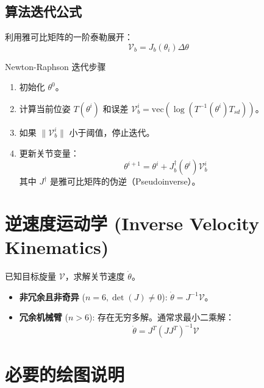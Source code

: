 \subsection{算法迭代公式}

利用雅可比矩阵的一阶泰勒展开：
\begin{equation}
    \mathcal{V}_b = J_b(\theta_i) \Delta \theta
\end{equation}

\begin{formulabox}{Newton-Raphson 迭代步骤}
\begin{enumerate}
    \item 初始化 $\theta^0$。
    \item 计算当前位姿 $T(\theta^i)$ 和误差 $\mathcal{V}_b^i = \text{vec}(\log(T^{-1}(\theta^i) T_{sd}))$。
    \item 如果 $\|\mathcal{V}_b^i\|$ 小于阈值，停止迭代。
    \item 更新关节变量：
    \begin{equation}
        \theta^{i+1} = \theta^i + J_b^\dagger(\theta^i) \mathcal{V}_b^i
    \end{equation}
    其中 $J^\dagger$ 是雅可比矩阵的伪逆（Pseudoinverse）。
\end{enumerate}
\end{formulabox}

\section{逆速度运动学 (Inverse Velocity Kinematics)}

已知目标旋量 $\mathcal{V}$，求解关节速度 $\dot{\theta}$。

\begin{itemize}
    \item \textbf{非冗余且非奇异} ($n=6, \det(J) \neq 0$): $\dot{\theta} = J^{-1} \mathcal{V}$。
    \item \textbf{冗余机械臂} ($n>6$): 存在无穷多解。通常求最小二乘解：
    \[ \dot{\theta} = J^T (J J^T)^{-1} \mathcal{V} \]
\end{itemize}

\section{必要的绘图说明}

\begin{center}
\end{center}


